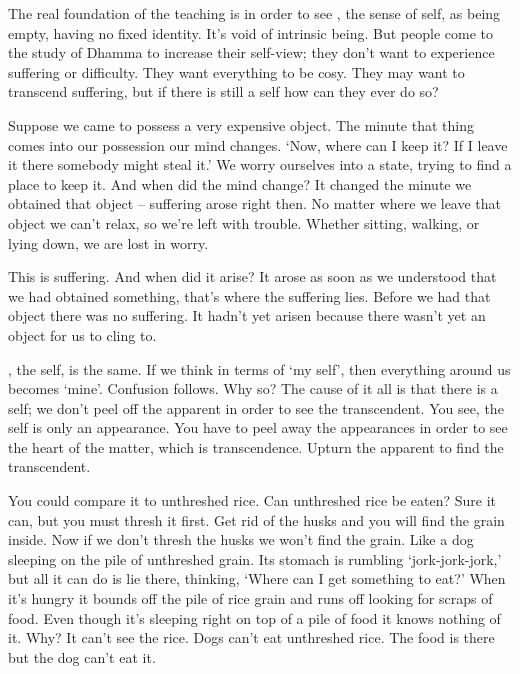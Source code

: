 The real foundation of the teaching is in order to see , the sense of self, as being empty, having no fixed identity. It's void of intrinsic being. But people come to the study of Dhamma to increase their self-view; they don't want to experience suffering or difficulty. They want everything to be cosy. They may want to transcend suffering, but if there is still a self how can they ever do so? 

Suppose we came to possess a very expensive object. The minute that thing comes into our possession our mind changes. `Now, where can I keep it? If I leave it there somebody might steal it.' We worry ourselves into a state, trying to find a place to keep it. And when did the mind change? It changed the minute we obtained that object -- suffering arose right then. No matter where we leave that object we can't relax, so we're left with trouble. Whether sitting, walking, or lying down, we are lost in worry. 

This is suffering. And when did it arise? It arose as soon as we understood that we had obtained something, that's where the suffering lies. Before we had that object there was no suffering. It hadn't yet arisen because there wasn't yet an object for us to cling to. 

, the self, is the same. If we think in terms of `my self', then everything around us becomes `mine'. Confusion follows. Why so? The cause of it all is that there is a self; we don't peel off the apparent in order to see the transcendent. You see, the self is only an appearance. You have to peel away the appearances in order to see the heart of the matter, which is transcendence. Upturn the apparent to find the transcendent. 

You could compare it to unthreshed rice. Can unthreshed rice be eaten? Sure it can, but you must thresh it first. Get rid of the husks and you will find the grain inside. Now if we don't thresh the husks we won't find the grain. Like a dog sleeping on the pile of unthreshed grain. Its stomach is rumbling `jork-jork-jork,' but all it can do is lie there, thinking, `Where can I get something to eat?' When it's hungry it bounds off the pile of rice grain and runs off looking for scraps of food. Even though it's sleeping right on top of a pile of food it knows nothing of it. Why? It can't see the rice. Dogs can't eat unthreshed rice. The food is there but the dog can't eat it. 

